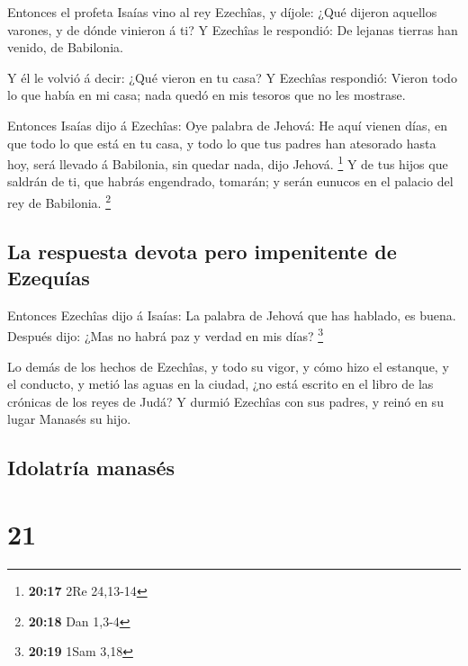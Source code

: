  Entonces el profeta Isaías vino al rey Ezechîas, y díjole:
¿Qué dijeron aquellos varones, y de dónde vinieron á ti? Y Ezechîas le
respondió: De lejanas tierras han venido, de Babilonia.

 Y él le volvió á decir: ¿Qué vieron en tu casa? Y Ezechîas
respondió: Vieron todo lo que había en mi casa; nada quedó en mis
tesoros que no les mostrase.

 Entonces Isaías dijo á Ezechîas: Oye palabra de Jehová:
 He aquí vienen días, en que todo lo que está en tu casa, y
todo lo que tus padres han atesorado hasta hoy, será llevado á
Babilonia, sin quedar nada, dijo Jehová. \footnote{\textbf{20:17} 2Re
  24,13-14}  Y de tus hijos que saldrán de ti, que habrás
engendrado, tomarán; y serán eunucos en el palacio del rey de Babilonia.
\footnote{\textbf{20:18} Dan 1,3-4}

\hypertarget{la-respuesta-devota-pero-impenitente-de-ezequuxedas}{%
\subsection{La respuesta devota pero impenitente de
Ezequías}\label{la-respuesta-devota-pero-impenitente-de-ezequuxedas}}

 Entonces Ezechîas dijo á Isaías: La palabra de Jehová que
has hablado, es buena. Después dijo: ¿Mas no habrá paz y verdad en mis
días? \footnote{\textbf{20:19} 1Sam 3,18}

 Lo demás de los hechos de Ezechîas, y todo su vigor, y
cómo hizo el estanque, y el conducto, y metió las aguas en la ciudad,
¿no está escrito en el libro de las crónicas de los reyes de Judá?
 Y durmió Ezechîas con sus padres, y reinó en su lugar
Manasés su hijo.

\hypertarget{idolatruxeda-manasuxe9s}{%
\subsection{Idolatría manasés}\label{idolatruxeda-manasuxe9s}}

\hypertarget{section-20}{%
\section{21}\label{section-20}}

